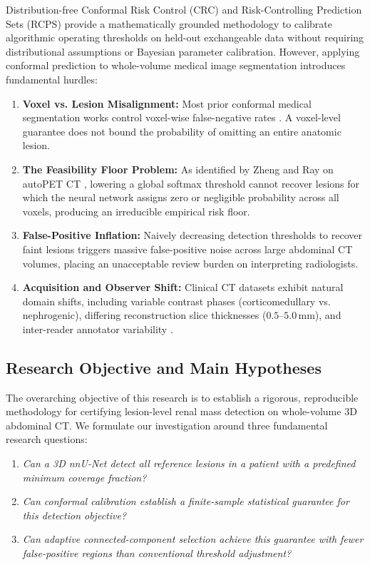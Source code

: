 \documentclass[journal,10pt,twocolumn]{IEEEtran}
\begin{document}
Distribution-free Conformal Risk Control (CRC) \cite{Angelopoulos2022crc} and Risk-Controlling Prediction Sets (RCPS) \cite{Bates2021rcps} provide a mathematically grounded methodology to calibrate algorithmic operating thresholds on held-out exchangeable data without requiring distributional assumptions or Bayesian parameter calibration. However, applying conformal prediction to whole-volume medical image segmentation introduces fundamental hurdles:
\begin{enumerate}
    \item \textbf{Voxel vs. Lesion Misalignment:} Most prior conformal medical segmentation works control voxel-wise false-negative rates \cite{Tan2025conformalLesion,Teneggi2025semcrc}. A voxel-level guarantee does not bound the probability of omitting an entire anatomic lesion.
    \item \textbf{The Feasibility Floor Problem:} As identified by Zheng and Ray on autoPET CT \cite{Zheng2026copa}, lowering a global softmax threshold cannot recover lesions for which the neural network assigns zero or negligible probability across all voxels, producing an irreducible empirical risk floor.
    \item \textbf{False-Positive Inflation:} Naively decreasing detection thresholds to recover faint lesions triggers massive false-positive noise across large abdominal CT volumes, placing an unacceptable review burden on interpreting radiologists.
    \item \textbf{Acquisition and Observer Shift:} Clinical CT datasets exhibit natural domain shifts, including variable contrast phases (corticomedullary vs. nephrogenic), differing reconstruction slice thicknesses ($0.5$--$5.0$\,mm), and inter-reader annotator variability \cite{Karunanayake2025tomography,Adhikary2026shift}.
\end{enumerate}

\subsection{Research Objective and Main Hypotheses}
The overarching objective of this research is to establish a rigorous, reproducible methodology for certifying lesion-level renal mass detection on whole-volume 3D abdominal CT. We formulate our investigation around three fundamental research questions:
\begin{enumerate}
    \item \emph{Can a 3D nnU-Net detect all reference lesions in a patient with a predefined minimum coverage fraction?}
    \item \emph{Can conformal calibration establish a finite-sample statistical guarantee for this detection objective?}
    \item \emph{Can adaptive connected-component selection achieve this guarantee with fewer false-positive regions than conventional threshold adjustment?}
\end{enumerate}
\end{document}
